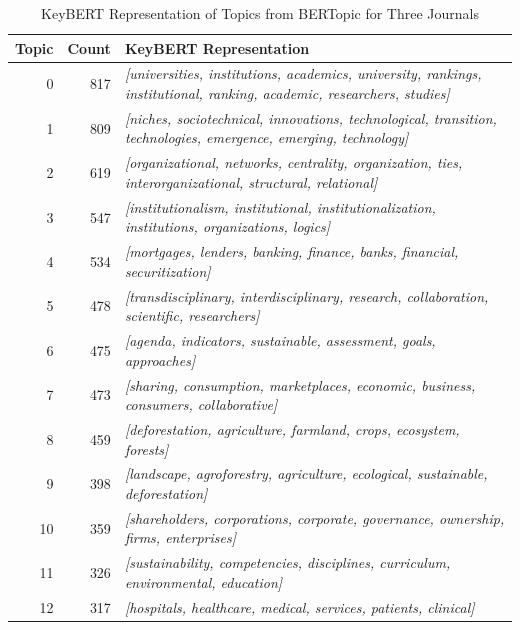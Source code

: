 \documentclass[12pt]{article}
\begin{document}
\begin{landscape}
\begin{table}[ht]
\small
\centering
\caption{KeyBERT Representation of Topics from BERTopic for Three Journals}
\label{tab:keybert_3j}
\begin{tabular}{|r|r|p{12cm}|}
\hline
\textbf{Topic} & \textbf{Count} & \textbf{KeyBERT Representation} \\ \hline
0              & 817            & \textit{[universities, institutions, academics, university, rankings, institutional, ranking, academic, researchers, studies]} \\ \hline
1              & 809            & \textit{[niches, sociotechnical, innovations, technological, transition, technologies, emergence, emerging, technology]} \\ \hline
2              & 619            & \textit{[organizational, networks, centrality, organization, ties, interorganizational, structural, relational]} \\ \hline
3              & 547            & \textit{[institutionalism, institutional, institutionalization, institutions, organizations, logics]} \\ \hline
4              & 534            & \textit{[mortgages, lenders, banking, finance, banks, financial, securitization]} \\ \hline
5              & 478            & \textit{[transdisciplinary, interdisciplinary, research, collaboration, scientific, researchers]} \\ \hline
6              & 475            & \textit{[agenda, indicators, sustainable, assessment, goals, approaches]} \\ \hline
7              & 473            & \textit{[sharing, consumption, marketplaces, economic, business, consumers, collaborative]} \\ \hline
8              & 459            & \textit{[deforestation, agriculture, farmland, crops, ecosystem, forests]} \\ \hline
9              & 398            & \textit{[landscape, agroforestry, agriculture, ecological, sustainable, deforestation]} \\ \hline
10             & 359            & \textit{[shareholders, corporations, corporate, governance, ownership, firms, enterprises]} \\ \hline
11             & 326            & \textit{[sustainability, competencies, disciplines, curriculum, environmental, education]} \\ \hline
12             & 317            & \textit{[hospitals, healthcare, medical, services, patients, clinical]} \\ \hline

\end{tabular}
\end{table}
\end{landscape}
\end{document}
